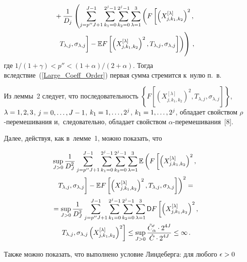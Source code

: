 \begin{multicols}{2}
\noindent
\begin{multline*}
{}+\fr{1}{D_j}\left( \sum\limits_{j = p''J+1}^{J-1}\sum\limits_{k_1 = 0}^{2^j - 1}
\sum\limits_{k_2 = 0}^{2^j - 1}\sum\limits_{\lambda = 1}^{3}
\left(F\left[\left(X_{j,k_1,k_2}^{[\lambda]}\right)^2,\right.\right.\right.\\[1pt]
\left.\left.\left.T_{\lambda,j},\sigma_{\lambda,j}
\vphantom{\left(X_{j,k_1,k_2}^{[\lambda]}\right)^2}
\right] -
 \Expect
F\left[\left(X_{j,k_1,k_2}^{[\lambda]}\right)^2,T_{\lambda,j},\sigma_{\lambda,j}
\right]\right)\!
\vphantom{\sum\limits_{j = 0}^{p''J}\sum\limits_{k_1 = 0}^{2^j - 1}}
\right)\,,
\end{multline*}
где ${1}/(1+\gamma) < p'' <(1+\alpha)/(2+\alpha)$. Тогда
вследствие~(\ref{Large_Coeff_Order}) первая сумма стремится к~нулю
п.~в.

Из леммы~2 следует, что последовательность
$\left\{F\left[\left(X_{j,k_1,k_2}^{[\lambda]}\right)^2,T_{\lambda,j},\sigma_{\lambda,j}\right]\right\}$,
$\lambda\hm=1,2,3$, $j \hm= 0,\dots, J \hm- 1$, $k_1 \hm= 1,\dots, 2^j$, $k_1 \hm=
1,\dots, 2^j$, обладает свойством $\rho$-пе\-ре\-ме\-ши\-ва\-ния
и,~следовательно, обладает свойством
$\alpha$-пе\-ре\-ме\-ши\-ва\-ния~[8].

Далее, действуя, как в~лемме~1, можно показать, что

\noindent
\begin{multline*}
\sup\limits_{J > 0} \fr{1}{D^2_J}
\sum\limits_{j = p''J + 1}^{J - 1}
\sum\limits_{k_1 = 0}^{2^j - 1} \sum\limits_{k_2 = 0}^{2^j - 1}
\sum\limits_{\lambda = 1}^{3} \Expect
\left( F\left[\left(X_{j,k_1,k_2}^{[\lambda]}\right)^2,\right.\right.\\[1pt]
\left.\left.T_{\lambda,j},\sigma_{\lambda,j}
\vphantom{\left(X_{j,k_1,k_2}^{[\lambda]}\right)^2}\right]
-
\Expect  F\left[\left(X_{j,k_1,k_2}^{[\lambda]}\right)^2,T_{\lambda,j},
\sigma_{\lambda,j}\right]\right)^2
= {}
\\[1pt]
{}=\sup\limits_{J > 0} \fr{1}{D^2_J}\sum\limits_{j = p''J + 1}^{J - 1}
\sum\limits_{k_1 = 0}^{2^j - 1} \sum\limits_{k_2 = 0}^{2^j - 1}
\sum\limits_{\lambda = 1}^{3} \Variance
F\left[\left(X_{j,k_1,k_2}^{[\lambda]}\right)^2,\right.\\[1pt]
\left.T_{\lambda,j},\sigma_{\lambda,j}
\left(X_{j,k_1,k_2}^{[\lambda]}\right)^2\right]
\leq \sup\limits_{J > 0} \fr{\tilde{C}'_\alpha \cdot2^{4J}}{\hat{C}\cdot 2^{4J}}
\leq \infty\,.
\end{multline*}
%

Также можно показать, что выполнено условие Линдеберга:
для любого $\epsilon \hm> 0$


\end{multicols}

